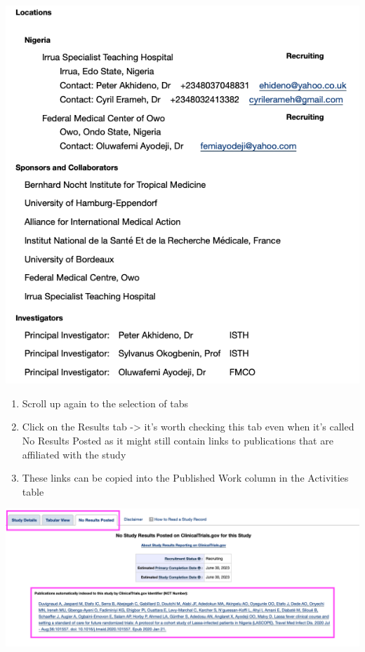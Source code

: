 \documentclass[
]{book}
\begin{document}
\includegraphics{images/clinicaltrial6.png}

\begin{enumerate}
\def\labelenumi{\arabic{enumi}.}
\setcounter{enumi}{14}
\item
  Scroll up again to the selection of tabs
\item
  Click on the Results tab -\textgreater{} it's worth checking this tab even when it's called No Results Posted as it might still contain links to publications that are affiliated with the study
\item
  These links can be copied into the Published Work column in the Activities table
\end{enumerate}

\includegraphics{images/clinicaltrial7.png}
\end{document}
